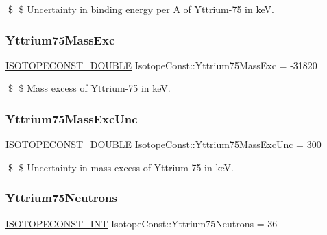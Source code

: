 \$ \$ Uncertainty in binding energy per A of Yttrium-\/75 in keV. \mbox{\label{group___isotope_const-_yttrium-_y75_ga5e9f881d1f886b325470373560c6e8fe}} 
\subsubsection{\texorpdfstring{Yttrium75\+Mass\+Exc}{Yttrium75MassExc}}
{\footnotesize\ttfamily \mbox{\hyperlink{group___isotope_const-_macros_ga8f45a7272ce02c0b4c65c44636ed719a}{I\+S\+O\+T\+O\+P\+E\+C\+O\+N\+S\+T\+\_\+\+D\+O\+U\+B\+LE}} Isotope\+Const\+::\+Yttrium75\+Mass\+Exc = -\/31820}

\$ \$ Mass excess of Yttrium-\/75 in keV. \mbox{\label{group___isotope_const-_yttrium-_y75_ga060fafbf2689e3809491a94024656bec}} 
\subsubsection{\texorpdfstring{Yttrium75\+Mass\+Exc\+Unc}{Yttrium75MassExcUnc}}
{\footnotesize\ttfamily \mbox{\hyperlink{group___isotope_const-_macros_ga8f45a7272ce02c0b4c65c44636ed719a}{I\+S\+O\+T\+O\+P\+E\+C\+O\+N\+S\+T\+\_\+\+D\+O\+U\+B\+LE}} Isotope\+Const\+::\+Yttrium75\+Mass\+Exc\+Unc = 300}

\$ \$ Uncertainty in mass excess of Yttrium-\/75 in keV. \mbox{\label{group___isotope_const-_yttrium-_y75_ga22470066b35522a0c5ed0efa7b5ded0d}} 
\subsubsection{\texorpdfstring{Yttrium75\+Neutrons}{Yttrium75Neutrons}}
{\footnotesize\ttfamily \mbox{\hyperlink{group___isotope_const-_macros_ga5f18360b3e99483a35c32d789e62621c}{I\+S\+O\+T\+O\+P\+E\+C\+O\+N\+S\+T\+\_\+\+I\+NT}} Isotope\+Const\+::\+Yttrium75\+Neutrons = 36}

